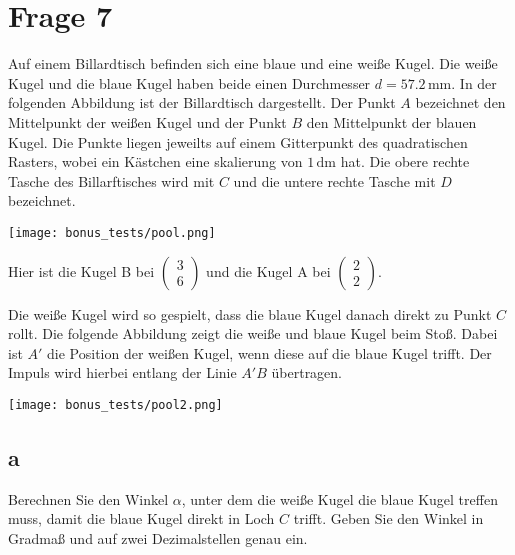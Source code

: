 \section{Frage 7}

Auf einem Billardtisch befinden sich eine blaue und eine weiße Kugel. Die weiße
Kugel und die blaue Kugel haben beide einen Durchmesser \(d =
57.2\,\text{mm}\). In der folgenden Abbildung ist der Billardtisch dargestellt.
Der Punkt \(A\) bezeichnet den Mittelpunkt der weißen Kugel und der Punkt \(B\)
den Mittelpunkt der blauen Kugel. Die Punkte liegen jeweilts auf einem
Gitterpunkt des quadratischen Rasters, wobei ein Kästchen eine skalierung von
\(1\,\text{dm}\) hat. Die obere rechte Tasche des Billarftisches wird mit \(C\)
und die untere rechte Tasche mit \(D\) bezeichnet.

\texttt{[image: bonus\_tests/pool.png]}

Hier ist die Kugel B bei \(\begin{pmatrix} 3 \\ 6 \end{pmatrix}\) und die Kugel A bei \(\begin{pmatrix} 2 \\ 2 \end{pmatrix}\).

Die weiße Kugel wird so gespielt, dass die blaue Kugel danach direkt zu Punkt
\(C\) rollt. Die folgende Abbildung zeigt die weiße und blaue Kugel beim Stoß.
Dabei ist \(A'\) die Position der weißen Kugel, wenn diese auf die blaue Kugel
trifft. Der Impuls wird hierbei entlang der Linie \(A'B\) übertragen.

\texttt{[image: bonus\_tests/pool2.png]}

\subsection{a}

Berechnen Sie den Winkel \(\alpha\), unter dem die weiße Kugel die blaue Kugel
treffen muss, damit die blaue Kugel direkt in Loch \(C\) trifft. Geben Sie den
Winkel in Gradmaß und auf zwei Dezimalstellen genau ein.

